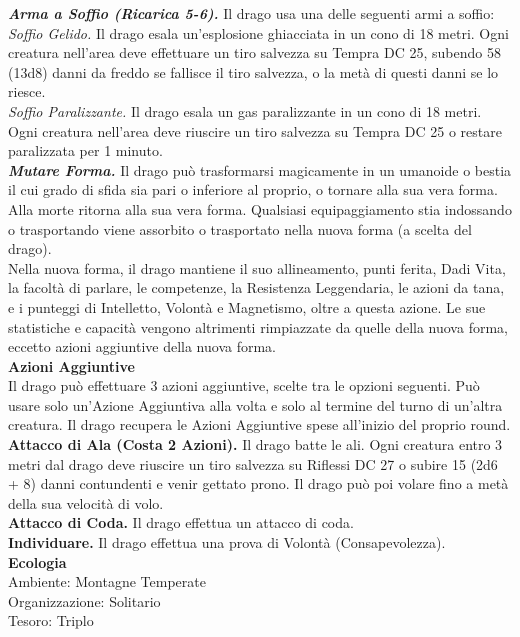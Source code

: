 \begin{multicols}{2}
\emph{\textbf{Arma a Soffio (Ricarica 5-6).}} Il drago usa una delle seguenti armi a soffio:\\
\emph{Soffio Gelido.} Il drago esala un'esplosione ghiacciata in un cono di 18 metri. Ogni creatura nell'area deve effettuare un tiro salvezza su Tempra DC  25, subendo 58 (13d8) danni da freddo se fallisce il tiro salvezza, o la metà di questi danni se lo riesce.\\
\emph{Soffio Paralizzante.} Il drago esala un gas paralizzante in un cono di 18 metri. Ogni creatura nell'area deve riuscire un tiro salvezza su Tempra DC  25 o restare paralizzata per 1 minuto.\\
\emph{\textbf{Mutare Forma.}} Il drago può trasformarsi magicamente in un umanoide o bestia il cui grado di sfida sia pari o inferiore al proprio, o tornare alla sua vera forma. Alla morte ritorna alla sua vera forma. Qualsiasi equipaggiamento stia indossando o trasportando viene assorbito o trasportato nella nuova forma (a scelta del drago).\\
Nella nuova forma, il drago mantiene il suo allineamento, punti ferita, Dadi Vita, la facoltà di parlare, le competenze, la Resistenza Leggendaria, le azioni da tana, e i punteggi di Intelletto, Volontà e Magnetismo, oltre a questa azione. Le sue statistiche e capacità vengono altrimenti rimpiazzate da quelle della nuova forma, eccetto azioni aggiuntive della nuova forma.\\
\textbf{Azioni Aggiuntive}\\
Il drago può effettuare 3 azioni aggiuntive, scelte tra le opzioni seguenti. Può usare solo un'Azione Aggiuntiva alla volta e solo al termine del turno di un'altra creatura. Il drago recupera le Azioni Aggiuntive spese all'inizio del proprio round.\\
\textbf{Attacco di Ala (Costa 2 Azioni).} Il drago batte le ali. Ogni creatura entro 3 metri dal drago deve riuscire un tiro salvezza su Riflessi DC  27 o subire 15 (2d6 + 8) danni contundenti e venir gettato prono. Il drago può poi volare fino a metà della sua velocità di volo.\\
\textbf{Attacco di Coda.} Il drago effettua un attacco di coda.\\
\textbf{Individuare.} Il drago effettua una prova di Volontà (Consapevolezza).\\
\textbf{Ecologia}\\
Ambiente: Montagne Temperate\\
Organizzazione: Solitario\\
Tesoro: Triplo\\

\end{multicols}
